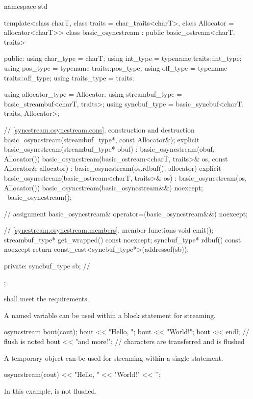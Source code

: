 %
\begin{codeblock}
namespace std {
  template<class charT, class traits = char_traits<charT>, class Allocator = allocator<charT>>
  class basic_osyncstream : public basic_ostream<charT, traits> {
  public:
    using char_type   = charT;
    using int_type    = typename traits::int_type;
    using pos_type    = typename traits::pos_type;
    using off_type    = typename traits::off_type;
    using traits_type = traits;

    using allocator_type = Allocator;
    using streambuf_type = basic_streambuf<charT, traits>;
    using syncbuf_type   = basic_syncbuf<charT, traits, Allocator>;

    // \ref{syncstream.osyncstream.cons}, construction and destruction
    basic_osyncstream(streambuf_type*, const Allocator&);
    explicit basic_osyncstream(streambuf_type* obuf)
      : basic_osyncstream(obuf, Allocator()) {}
    basic_osyncstream(basic_ostream<charT, traits>& os, const Allocator& allocator)
      : basic_osyncstream(os.rdbuf(), allocator) {}
    explicit basic_osyncstream(basic_ostream<charT, traits>& os)
      : basic_osyncstream(os, Allocator()) {}
    basic_osyncstream(basic_osyncstream&&) noexcept;
    ~basic_osyncstream();

    // assignment
    basic_osyncstream& operator=(basic_osyncstream&&) noexcept;

    // \ref{syncstream.osyncstream.members}, member functions
    void emit();
    streambuf_type* get_wrapped() const noexcept;
    syncbuf_type* rdbuf() const noexcept { return const_cast<syncbuf_type*>(addressof(sb)); }

  private:
    syncbuf_type sb;    // \expos
  };
}
\end{codeblock}

\pnum
{} shall meet
the  requirements.

\pnum
\begin{example}
A named variable can be used within a block statement for streaming.
\begin{codeblock}
{
  osyncstream bout(cout);
  bout << "Hello, ";
  bout << "World!";
  bout << endl; // flush is noted
  bout << "and more!\n";
}   // characters are transferred and  is flushed
\end{codeblock}
\end{example}

\pnum
\begin{example}
A temporary object can be used for streaming within a single statement.
\begin{codeblock}
osyncstream(cout) << "Hello, " << "World!" << '\n';
\end{codeblock}
In this example,  is not flushed.
\end{example}

